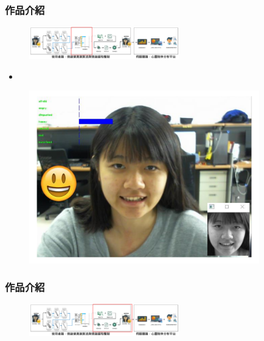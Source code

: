 \documentclass[10pt, conference, compsocconf]{beamer}
\begin{document}
\begin{CJK}{UTF8}{}
\begin{frame}
\end{frame}

\begin{frame}
\frametitle{作品介紹}

\begin{figure}[t]
\begin{flushright}
\vspace{-2mm}
\includegraphics[width=6.5cm]{./Figures/framework_version4_3.pdf}
\end{flushright}
\end{figure}

\vspace{-5mm}

\begin{itemize}
\item {}
\end{itemize}


\begin{figure}[!t]
\begin{center}
\includegraphics[width=10cm]{./Figures/DetectResult.pdf}
\end{center}
\end{figure}
\end{frame}

\begin{frame}
\frametitle{作品介紹}

\vspace{-15mm}
\begin{figure}[t]
\begin{flushright}
\vspace{-2mm}
\includegraphics[width=6.5cm]{./Figures/framework_version4_13.pdf}
\end{flushright}
\end{figure}


\end{frame}
\end{CJK}
\end{document}
